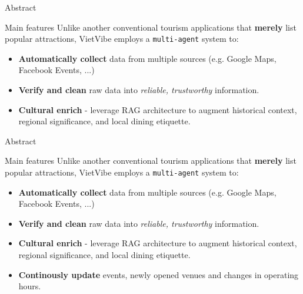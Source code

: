 \begin{frame}{Abstract}
    \begin{block}{Main features}
    Unlike another conventional tourism applications that \textbf{merely} list popular attractions, VietVibe employs a \texttt{multi-agent} system to:
    \begin{itemize}
        \item \textbf{Automatically collect} data from multiple sources (e.g. Google Maps, Facebook Events, ...)
        \item \textbf{Verify and clean} raw data into \textit{reliable, trustworthy} information.
        \item \textbf{Cultural enrich} - leverage RAG architecture to augment historical context, regional significance, and local dining etiquette.
    \end{itemize}
    \end{block}
\end{frame}

\begin{frame}{Abstract}
    \begin{block}{Main features}
    Unlike another conventional tourism applications that \textbf{merely} list popular attractions, VietVibe employs a \texttt{multi-agent} system to:
    \begin{itemize}
        \item \textbf{Automatically collect} data from multiple sources (e.g. Google Maps, Facebook Events, ...)
        \item \textbf{Verify and clean} raw data into \textit{reliable, trustworthy} information.
        \item \textbf{Cultural enrich} - leverage RAG architecture to augment historical context, regional significance, and local dining etiquette.
        \item \textbf{Continously update} events, newly opened venues and changes in operating hours.
    \end{itemize}
    \end{block}
\end{frame}

